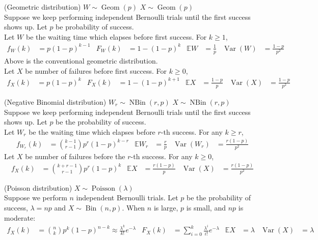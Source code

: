 \documentclass{huhtakm-template-book}
\newcommand{\expect}{\mathbb{E}}
\DeclareMathOperator{\Bin}{Bin}
\DeclareMathOperator{\NBin}{NBin}
\DeclareMathOperator{\Geom}{Geom}
\DeclareMathOperator{\Poisson}{Poisson}
\DeclareMathOperator{\Var}{Var}
\begin{document}
\begin{seg}(Geometric distribution) $W\sim\Geom(p)$ $X\sim\Geom(p)$\\
	Suppose we keep performing independent Bernoulli trials until the first success shows up. Let $p$ be probability of success.\\
	Let $W$ be the waiting time which elapses before first success. For $k\geq 1$,
	\begin{align*}
		f_{W}(k)&=p(1-p)^{k-1} & F_{W}(k)&=1-(1-p)^{k} & \expect W&=\frac{1}{p} & \Var(W)&=\frac{1-p}{p^{2}}
	\end{align*}
	Above is the conventional geometric distribution.\\
	Let $X$ be number of failures before first success. For $k\geq 0$,
	\begin{align*}
		f_{X}(k)&=p(1-p)^{k} & F_{X}(k)&=1-(1-p)^{k+1} & \expect X&=\frac{1-p}{p} & \Var(X)&=\frac{1-p}{p^{2}}
	\end{align*}
\end{seg}
\begin{seg}(Negative Binomial distribution) $W_{r}\sim\NBin(r,p)$ $X\sim\NBin(r,p)$\\
	Suppose we keep performing independent Bernoulli trials until the first success shows up. Let $p$ be the probability of success.\\
	Let $W_{r}$ be the waiting time which elapses before $r$-th success. For any $k\geq r$,
	\begin{align*}
		f_{W_{r}}(k)&=\binom{k-1}{r-1}p^{r}(1-p)^{k-r} & \expect W_{r}&=\frac{r}{p} & \Var(W_{r})&=\frac{r(1-p)}{p^{2}}
	\end{align*}
	Let $X$ be number of failures before the $r$-th success. For any $k\geq 0$,
	\begin{align*}
		f_{X}(k)&=\binom{k+r-1}{r-1}p^{r}(1-p)^{k} & \expect X&=\frac{r(1-p)}{p} & \Var(X)&=\frac{r(1-p)}{p^{2}}
	\end{align*}
\end{seg}
\begin{seg}(Poisson distribution) $X\sim\Poisson(\lambda)$\\
	Suppose we perform $n$ independent Bernoulli trials. Let $p$ be the probability of success, $\lambda=np$ and $X\sim\Bin(n,p)$. When $n$ is large, $p$ is small, and $np$ is moderate:
	\begin{align*}
		f_{X}(k)&=\binom{n}{k}p^{k}(1-p)^{n-k}\approx\frac{\lambda^{k}}{k!}e^{-\lambda} & F_{X}(k)&=\sum_{i=0}^{k}\frac{\lambda^{i}}{i!}e^{-\lambda} & \expect X&=\lambda & \Var(X)&=\lambda
	\end{align*}
\end{seg}
\end{document}
